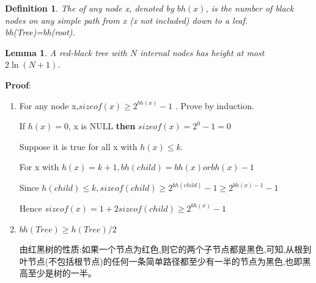 \documentclass{article}
\newtheorem*{Definition}{Definition}
\newtheorem*{Lemma}{Lemma}
\begin{document}
\begin{Definition}
    The {\color{blue}{black-height}} of any node x, denoted by $bh(x)$, is the number of black nodes on any simple path from x (x not included) down to a leaf. bh(Tree)=bh(root).
\end{Definition}

\begin{Lemma}
    A red-black tree with $N$ internal nodes has height at most $2\ln (N+1)$.
\end{Lemma}

\textbf{Proof}:\par
\begin{enumerate}
    \item For any node x,$sizeof(x) \ge 2^{bh(x)}-1$ . Prove by induction.\par
    If $h(x) = 0$, x is NULL \textbf{then} $sizeof(x) = 2^0 - 1 = 0$\par
    Suppose it is true for all x with $ h(x) \le k$. \par
    For x with $h(x) = k+1 , bh(child) = bh(x) or bh(x)-1$ \par
    Since $h(child) \le k, sizeof(child) \ge 2^{bh(child)} - 1 \ge 2^{bh(x)-1} -1 $ \par
    Hence $sizeof(x) = 1 + 2sizeof(child) \ge 2^{bh(x)} - 1$
    \item $bh(Tree) \ge h(Tree) / 2$ \par
    由红黑树的性质:如果一个节点为红色,则它的两个子节点都是黑色,可知,从根到叶节点(不包括根节点)的任何一条简单路径都至少有一半的节点为黑色,也即黑高至少是树的一半。
\end{enumerate}
\end{document}

